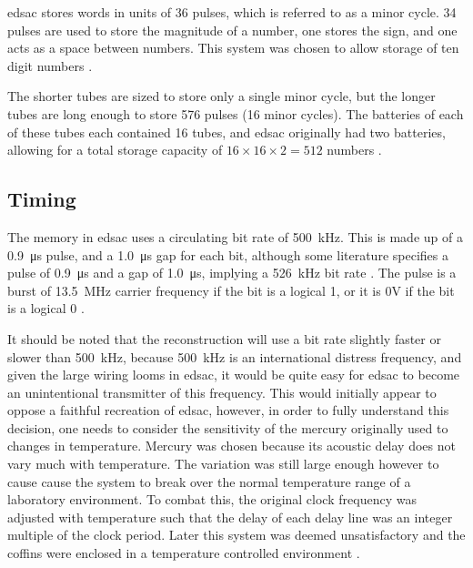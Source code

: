 \Gls{edsac} stores words in units of 36 pulses, which is referred to as a minor cycle. 34 pulses are used to store the magnitude of a number, one stores the sign, and one acts as a space between numbers. This system was chosen to allow storage of ten digit numbers \cite[p.209]{wilkes1948}. 

The shorter tubes are sized to store only a single minor cycle, but the longer tubes are long enough to store 576 pulses (16 minor cycles). The batteries of each of these tubes each contained 16 tubes, and \gls{edsac} originally had two batteries, allowing for a total storage capacity of $16 \times 16 \times 2 = 512$ numbers \cite[p.210]{wilkes1948}.

\subsection{Timing} \label{sec:review-delay-timing}
The memory in \gls{edsac} uses a circulating bit rate of \SI{500}{\kilo\hertz}. This is made up of a \SI{0.9}{\micro\second} pulse, and a \SI{1.0}{\micro\second} gap for each bit, although some literature specifies a pulse of \SI{0.9}{\micro\second} and a gap of  \SI{1.0}{\micro\second}, implying a \SI{526}{\kilo\hertz} bit rate \cite[p.209]{wilkes1948} \cite[p.2]{cambridge1948}. The pulse is a burst of \SI{13.5}{\mega\hertz} carrier frequency if the bit is a logical 1, or it is 0V if the bit is a logical 0 \cite[p.2]{cambridge1948}.

It should be noted that the reconstruction will use a bit rate slightly faster or slower than \SI{500}{\kilo\hertz}, because \SI{500}{\kilo\hertz} is an international distress frequency, and given the large wiring looms in \gls{edsac}, it would be quite easy for \gls{edsac} to become an unintentional transmitter of this frequency. This would initially appear to oppose a faithful recreation of \gls{edsac}, however, in order to fully understand this decision, one needs to consider the sensitivity of the mercury originally used to changes in temperature. Mercury was chosen because its acoustic delay does not vary much with temperature\cite[p.209]{wilkes1948}. The variation was still large enough however to cause cause the system to break over the normal temperature range of a laboratory environment. To combat this, the original clock frequency was adjusted with temperature such that the delay of each delay line was an integer multiple of the clock period. Later this system was deemed unsatisfactory and the coffins were enclosed in a temperature controlled environment \cite[p.81]{wilkes1952}.

